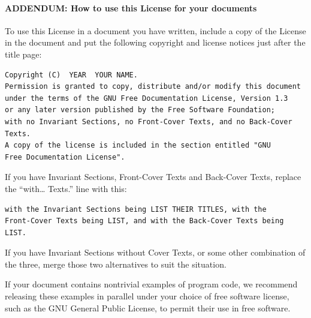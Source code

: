 \documentclass[10pt,]{book}
\theoremstyle{plain}
\theoremstyle{definition}
\theoremstyle{definition}
\numberwithin{equation}{chapter}
\begin{document}
\paragraph[{ADDENDUM: How to use this License for your documents}]{ADDENDUM: How to use this License for your documents}\hypertarget{gfdl-addendum}{}
To use this License in a document you have written, include a copy of the License in the document and put the following copyright and license notices just after the title page:%
\begin{verbatim}
Copyright (C)  YEAR  YOUR NAME.
Permission is granted to copy, distribute and/or modify this document
under the terms of the GNU Free Documentation License, Version 1.3
or any later version published by the Free Software Foundation;
with no Invariant Sections, no Front-Cover Texts, and no Back-Cover Texts.
A copy of the license is included in the section entitled "GNU
Free Documentation License".
\end{verbatim}
If you have Invariant Sections, Front-Cover Texts and Back-Cover Texts, replace the ``with\dots{} Texts.'' line with this:%
\begin{verbatim}
with the Invariant Sections being LIST THEIR TITLES, with the
Front-Cover Texts being LIST, and with the Back-Cover Texts being LIST.
\end{verbatim}
If you have Invariant Sections without Cover Texts, or some other combination of the three, merge those two alternatives to suit the situation.%
\par
If your document contains nontrivial examples of program code, we recommend releasing these examples in parallel under your choice of free software license, such as the GNU General Public License, to permit their use in free software.%
%
\backmatter
%
\end{document}
